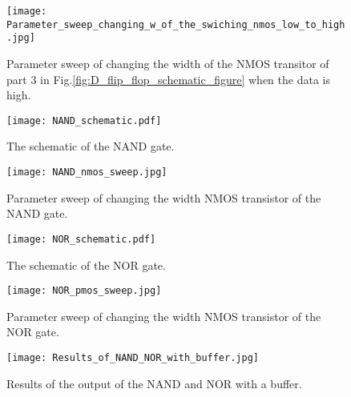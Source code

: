 \begin{appendices}
\begin{figure}[h]
 \texttt{[image: Parameter\_sweep\_changing\_w\_of\_the\_swiching\_nmos\_low\_to\_high.jpg]}
 \caption{Parameter sweep of changing the width of the NMOS transitor of part 3 in Fig.\ref{fig:D_flip_flop_schematic_figure} when the data is high.}
 \label{fig:Parameter_sweep_changing_w_of_the_swiching_nmos_low_to_high_figure}
\end{figure}

\begin{figure}[h]
\texttt{[image: NAND\_schematic.pdf]}
\caption{The schematic of the NAND gate.}
\label{fig:NAND_schematic_figure}
\end{figure}

\begin{figure}[h]
 \texttt{[image: NAND\_nmos\_sweep.jpg]}
 \caption{Parameter sweep of changing the width NMOS transistor of the NAND gate.}
 \label{fig:NAND_nmos_sweep_figure}
\end{figure}



\begin{figure}[h]
\texttt{[image: NOR\_schematic.pdf]}
\caption{The schematic of the NOR gate.}
\label{fig:NOR_schematic_figure}
\end{figure}

\begin{figure}[h]
 \texttt{[image: NOR\_pmos\_sweep.jpg]}
 \caption{Parameter sweep of changing the width NMOS transistor of the NOR gate.}
 \label{fig:NOR_pmos_sweep_figure}
\end{figure}

\begin{figure}[h]
 \texttt{[image: Results\_of\_NAND\_NOR\_with\_buffer.jpg]}
 \caption{Results of the output of the NAND and NOR with a buffer.}
 \label{fig:Results_of_NAND_NOR_with_buffer_figure}
\end{figure}


\end{appendices}

